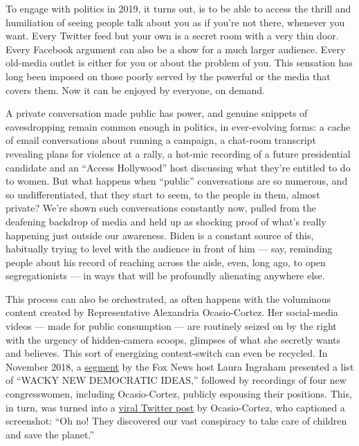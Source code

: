 To engage with politics in 2019, it turns out, is to be able to access
the thrill and humiliation of seeing people talk about you as if you're
not there, whenever you want. Every Twitter feed but your own is a
secret room with a very thin door. Every Facebook argument can also be a
show for a much larger audience. Every old-media outlet is either for
you or about the problem of you. This sensation has long been imposed on
those poorly served by the powerful or the media that covers them. Now
it can be enjoyed by everyone, on demand.

A private conversation made public has power, and genuine snippets of
eavesdropping remain common enough in politics, in ever-evolving forms:
a cache of email conversations about running a campaign, a chat-room
transcript revealing plans for violence at a rally, a hot-mic recording
of a future presidential candidate and an ``Access Hollywood'' host
discussing what they're entitled to do to women. But what happens when
``public'' conversations are so numerous, and so undifferentiated, that
they start to seem, to the people in them, almost private? We're shown
such conversations constantly now, pulled from the deafening backdrop of
media and held up as shocking proof of what's really happening just
outside our awareness. Biden is a constant source of this, habitually
trying to level with the audience in front of him --- say, reminding
people about his record of reaching across the aisle, even, long ago, to
open segregationists --- in ways that will be profoundly alienating
anywhere else.

This process can also be orchestrated, as often happens with the
voluminous content created by Representative Alexandria Ocasio-Cortez.
Her social-media videos --- made for public consumption --- are
routinely seized on by the right with the urgency of hidden-camera
scoops, glimpses of what she secretly wants and believes. This sort of
energizing context-switch can even be recycled. In November 2018, a
\href{https://video.foxnews.com/v/5966650393001/\#sp=show-clips}{segment}
by the Fox News host Laura Ingraham presented a list of ``WACKY NEW
DEMOCRATIC IDEAS,'' followed by recordings of four new congresswomen,
including Ocasio-Cortez, publicly espousing their positions. This, in
turn, was turned into a
\href{https://twitter.com/AOC/status/1062731138031120384?ref_src=twsrc\%5Etfw\%7Ctwcamp\%5Etweetembed\%7Ctwterm\%5E1062731138031120384\&ref_url=https\%3A\%2F\%2Fwww.commondreams.org\%2Fnews\%2F2018\%2F11\%2F14\%2Ffox-news-once-again-forgets-radical-new-democratic-ideas-are-really-popular}{viral
Twitter post} by Ocasio-Cortez, who captioned a screenshot: ``Oh no!
They discovered our vast conspiracy to take care of children and save
the planet.''


